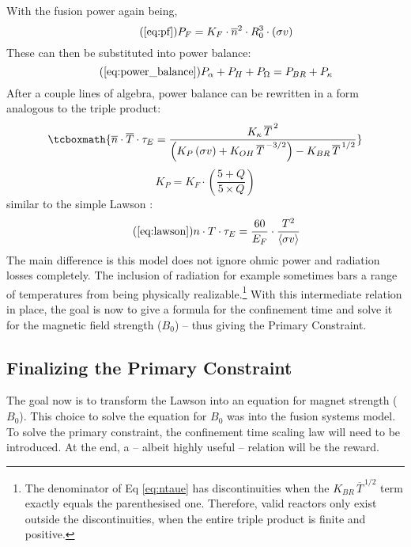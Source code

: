 With the fusion power again being,
\begin{equation}
	\tag{\ref{eq:pf}}
	P_F = K_F \cdot \overline{n}^2 \cdot R_0^3  \cdot (\sigma v)
\end{equation}
These can then be substituted into power balance:
\begin{equation}
	\tag{\ref{eq:power_balance}}
	P_\alpha + P_H + P_\Omega = P_{BR} + P_\kappa
\end{equation}
After a couple lines of algebra, power balance can be rewritten in a form analogous to the triple product:
\begin{equation}
	\label{eq:ntaue}
	\tcboxmath{
	 \overline{n}  \cdot \overline{T} \cdot \tau_E = \frac{ K_\kappa \, \overline{T}^{\,2} }{ \left( K_P \, (\sigma v) +  K_{OH} \, \overline{T}^{  \,-3/2 } \right) - K_{BR} \, \overline{T}^{  \,1/2 } }
	 }
\end{equation}
\begin{equation}
	K_P = K_F \cdot \left( \frac{5 + Q}{5 \times Q} \right)
\end{equation}
 similar to the simple Lawson :
\begin{equation}
	\tag{\ref{eq:lawson}}
	n \cdot T \cdot \tau_E = \frac{ 60 }{ E_F } \cdot \frac{ T ^ 2 }{ \langle \sigma v \rangle }
\end{equation}
The main difference is this model does not ignore ohmic power and radiation losses completely. The inclusion of radiation for example sometimes bars a range of temperatures from being physically realizable.\footnote{ The denominator of Eq \ref{eq:ntaue} has discontinuities when the $K_{BR} \, \overline{T}^{  \,1/2 }$ term exactly equals the parenthesised one. Therefore, valid reactors only exist outside the discontinuities, when the entire triple product is finite and positive. } With this intermediate relation in place, the goal is now to give a formula for the confinement time and solve it for the magnetic field strength ($B_0$) -- thus giving the Primary Constraint.

\subsection{Finalizing the Primary Constraint}

The goal now is to transform the Lawson  into an equation for magnet strength ($B_0$). This choice to solve the equation for $B_0$ was  into the fusion systems model. To solve the primary constraint, the confinement time scaling law will need to be introduced. At the end, a  -- albeit highly useful -- relation will be the reward.

